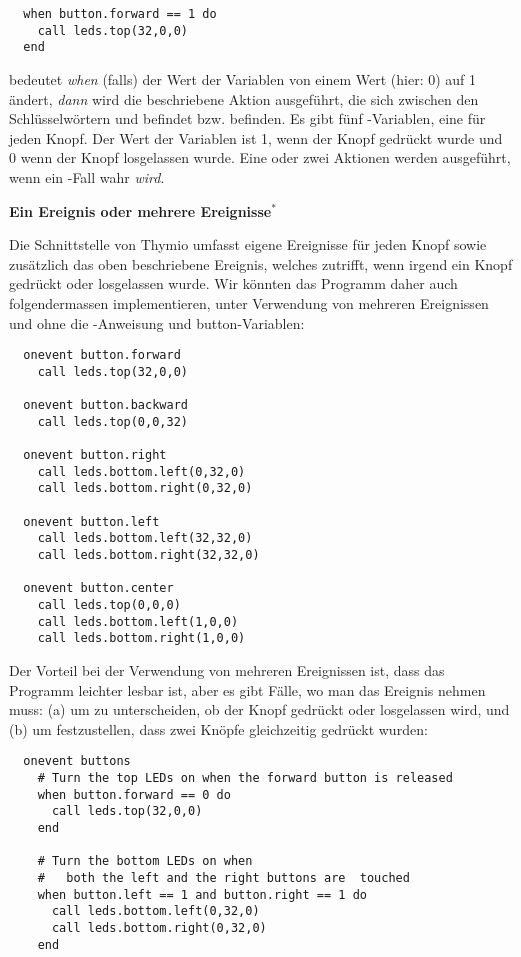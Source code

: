 \begin{footnotesize}
\begin{verbatim}
  when button.forward == 1 do
    call leds.top(32,0,0)
  end
\end{verbatim}
\end{footnotesize}

bedeutet \emph{when} (falls) der Wert der Variablen  von einem Wert (hier: 0) auf 1 ändert, \emph{dann} wird die beschriebene Aktion ausgeführt, die sich zwischen den Schlüsselwörtern  und  befindet bzw. befinden.
Es gibt fünf -Variablen, eine für jeden Knopf. Der Wert der Variablen ist 1, wenn der Knopf gedrückt wurde und 0 wenn der Knopf losgelassen wurde. Eine oder zwei Aktionen werden ausgeführt, wenn ein -Fall wahr \emph{wird}.

\textbf{\large Ein Ereignis oder mehrere Ereignisse$^*$}

Die Schnittstelle von Thymio umfasst eigene Ereignisse für jeden Knopf sowie zusätzlich das oben beschriebene  Ereignis, welches zutrifft, wenn irgend ein Knopf gedrückt oder losgelassen wurde. Wir könnten das Programm daher auch folgendermassen implementieren, unter Verwendung von mehreren Ereignissen und ohne die -Anweisung und button-Variablen:

\begin{footnotesize}
\begin{verbatim}
  onevent button.forward
    call leds.top(32,0,0)
  
  onevent button.backward
    call leds.top(0,0,32)
  
  onevent button.right
    call leds.bottom.left(0,32,0)
    call leds.bottom.right(0,32,0)
  
  onevent button.left
    call leds.bottom.left(32,32,0)
    call leds.bottom.right(32,32,0)
  
  onevent button.center
    call leds.top(0,0,0)
    call leds.bottom.left(1,0,0)
    call leds.bottom.right(1,0,0)
\end{verbatim}
\end{footnotesize}

Der Vorteil bei der Verwendung von mehreren Ereignissen ist, dass das Programm leichter lesbar ist, aber es gibt Fälle, wo man das Ereignis  nehmen muss:  (a) um zu unterscheiden, ob der Knopf gedrückt oder losgelassen wird,
und (b) um festzustellen, dass zwei Knöpfe gleichzeitig gedrückt wurden:

\begin{footnotesize}
\begin{verbatim}
  onevent buttons
    # Turn the top LEDs on when the forward button is released
    when button.forward == 0 do
      call leds.top(32,0,0)
    end

    # Turn the bottom LEDs on when
    #   both the left and the right buttons are  touched
    when button.left == 1 and button.right == 1 do
      call leds.bottom.left(0,32,0)
      call leds.bottom.right(0,32,0)
    end
\end{verbatim}
\end{footnotesize}

